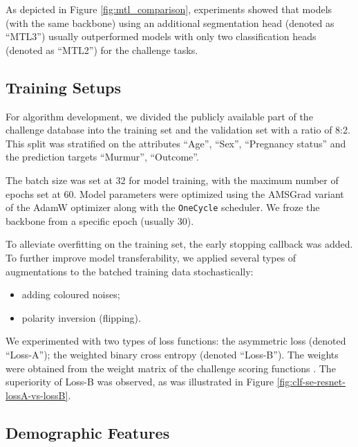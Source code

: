 

As depicted in Figure \ref{fig:mtl_comparison}, experiments showed that models (with the same backbone) using an additional segmentation head (denoted as ``MTL3'') usually outperformed models with only two classification heads (denoted as ``MTL2'') for the challenge tasks.



\subsection{Training Setups}
\label{subsec:training}


For algorithm development, we divided the publicly available part of the challenge database into the training set and the validation set with a ratio of 8:2. This split was stratified on the attributes ``Age'', ``Sex'', ``Pregnancy status'' and the prediction targets ``Murmur'', ``Outcome''.

The batch size was set at 32 for model training, with the maximum number of epochs set at 60. Model parameters were optimized using the AMSGrad variant of the AdamW optimizer along with the \texttt{OneCycle} scheduler. We froze the backbone from a specific epoch (usually 30).

To alleviate overfitting on the training set, the early stopping callback was added. To further improve model transferability, we applied several types of augmentations to the batched training data stochastically:
\begin{itemize}
    \item adding coloured noises;
    \item polarity inversion (flipping).
\end{itemize}

We experimented with two types of loss functions: the asymmetric loss (denoted ``Loss-A''); the weighted binary cross entropy (denoted ``Loss-B''). The weights were obtained from the weight matrix of the challenge scoring functions \cite{cinc2022}. The superiority of Loss-B was observed, as was illustrated in Figure \ref{fig:clf-se-resnet-lossA-vs-lossB}.



\subsection{Demographic Features}
\label{subsec:demo_feat}


